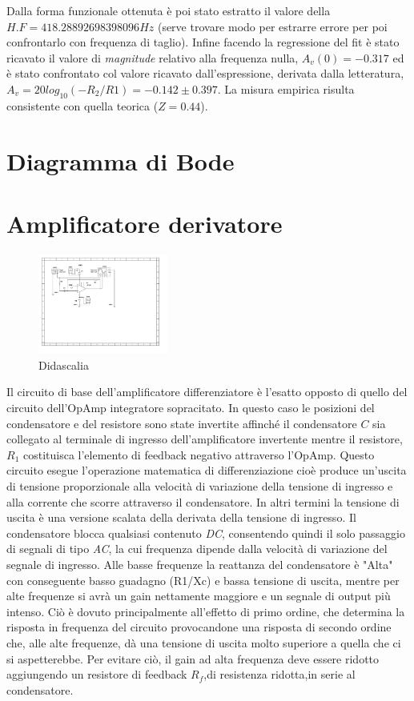 \documentclass[journal]{IEEEtran}
\begin{document}
Dalla forma funzionale ottenuta è poi stato estratto il valore della $H.F = 418.28892698398096 Hz$ (serve trovare modo per estrarre errore per poi confrontarlo con frequenza di taglio).
Infine facendo la regressione del fit è stato ricavato il valore di \textit{magnitude} relativo alla frequenza nulla, $A_{v}(0)=-0.317$ ed è stato confrontato col valore ricavato dall'espressione, derivata dalla letteratura, $A_{v} = 20log_{10}(-R_{2}/R{1}) = -0.142 \pm 0.397 $. La misura empirica risulta consistente con quella teorica ($Z=0.44$).
\section{Diagramma di Bode}


\section{Amplificatore derivatore} %
\begin{figure}[H]%
\begin {center}
\includegraphics[width=0.38\textwidth]{sch-simulations/output/OPA-deriv.pdf}
\caption{Didascalia}
\label{fig:oscilloscope}
\end {center}
\end{figure}
Il circuito di base dell'amplificatore differenziatore è l'esatto opposto di quello del circuito dell'OpAmp integratore sopracitato. In questo caso le posizioni del condensatore e del resistore sono state invertite affinché il condensatore $C$ sia collegato al terminale di ingresso dell'amplificatore invertente mentre il resistore, $R_1$ costituisca l'elemento di feedback negativo attraverso l'OpAmp. Questo circuito esegue l'operazione matematica di differenziazione cioè produce un'uscita di tensione proporzionale alla velocità di variazione della tensione di ingresso e alla corrente che scorre attraverso il condensatore. In altri termini la tensione di uscita è una versione scalata della derivata della tensione di ingresso. Il condensatore blocca qualsiasi contenuto \textit{DC}, consentendo  quindi il solo passaggio di segnali di tipo \textit{AC}, la cui frequenza dipende dalla velocità di variazione del segnale di ingresso. Alle basse frequenze la reattanza del condensatore è "Alta" con conseguente basso guadagno (R1/Xc) e bassa tensione di uscita, mentre per alte frequenze si avrà un gain nettamente maggiore e un segnale di output più intenso. Ciò è dovuto principalmente all'effetto di primo ordine, che determina la risposta in frequenza del circuito provocandone una risposta di secondo ordine che, alle alte frequenze, dà una tensione di uscita molto superiore a quella che ci si aspetterebbe. Per evitare ciò, il gain ad alta frequenza deve essere ridotto aggiungendo un resistore di feedback $R_f$,di resistenza ridotta,in serie al condensatore. 
\end{document}
